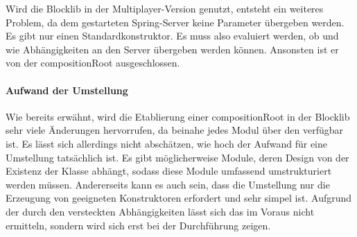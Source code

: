 Wird die Blocklib in der Multiplayer-Version genutzt, entsteht ein weiteres Problem, da dem gestarteten Spring-Server keine Parameter übergeben werden. Es gibt nur einen Standardkonstruktor. Es muss also evaluiert werden, ob und wie Abhängigkeiten an den Server übergeben werden können. Ansonsten ist er von der \gls{compositionRoot} ausgeschlossen.

\paragraph{Aufwand der Umstellung}
Wie bereits erwähnt, wird die Etablierung einer \gls{compositionRoot} in der Blocklib sehr viele Änderungen hervorrufen, da beinahe jedes Modul über den \classContext{} verfügbar ist. Es lässt sich allerdings nicht abschätzen, wie hoch der Aufwand für eine Umstellung tatsächlich ist. Es gibt möglicherweise Module, deren Design von der Existenz der Klasse \classContext{} abhängt, sodass diese Module umfassend umstrukturiert werden müssen. Andererseits kann es auch sein, dass die Umstellung nur die Erzeugung von geeigneten Konstruktoren erfordert und sehr simpel ist. Aufgrund der durch den \classContext{} versteckten Abhängigkeiten lässt sich das im Voraus nicht ermitteln, sondern wird sich erst bei der Durchführung zeigen.
